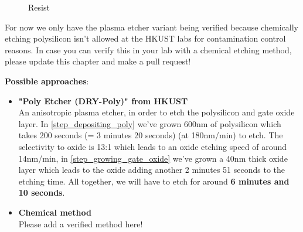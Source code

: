\begin{figure}[H]
	\centering
	\begin{tikzpicture}[node distance = 3cm, auto, thick,scale=\CrossAndTopSection, every node/.style={transform shape}]
		
	\end{tikzpicture}
	\begin{tikzpicture}[node distance = 3cm, auto, thick,scale=\CrossAndTopSection, every node/.style={transform shape}]
		
	\end{tikzpicture}
	\drawStepArrow{}
	\begin{tikzpicture}[node distance = 3cm, auto, thick,scale=\CrossAndTopSection, every node/.style={transform shape}]
		
	\end{tikzpicture}
	\begin{tikzpicture}[node distance = 3cm, auto, thick,scale=\CrossAndTopSection, every node/.style={transform shape}]
		
	\end{tikzpicture}
	\caption{Resist}
\end{figure}

\begin{mdframed}[linewidth=2pt,linecolor=red]
For now we only have the plasma etcher variant being verified because chemically etching polysilicon isn't allowed at the HKUST labs for contamination control reasons.
In case you can verify this in your lab with a chemical etching method, please update this chapter and make a pull request!
\end{mdframed}

\textbf{Possible approaches}:
\begin{itemize}
	\item \textbf{"Poly Etcher (DRY-Poly)" from HKUST} \\
	An anisotropic plasma etcher, in order to etch the polysilicon and gate oxide layer.
	In \autoref{step_depositing_poly} we've grown 600nm of polysilicon which takes 200 seconds (= 3 minutes 20 seconds) (at 180nm/min) to etch.
	The selectivity to oxide is 13:1 which leads to an oxide etching speed of around 14nm/min, in \autoref{step_growing_gate_oxide} we've grown a 40nm thick oxide layer which leads to the oxide adding another 2 minutes 51 seconds to the etching time.
	All together, we will have to etch for around \textbf{6 minutes and 10 seconds}.
	\item \textbf{Chemical method} \\
	Please add a verified method here!
\end{itemize}
